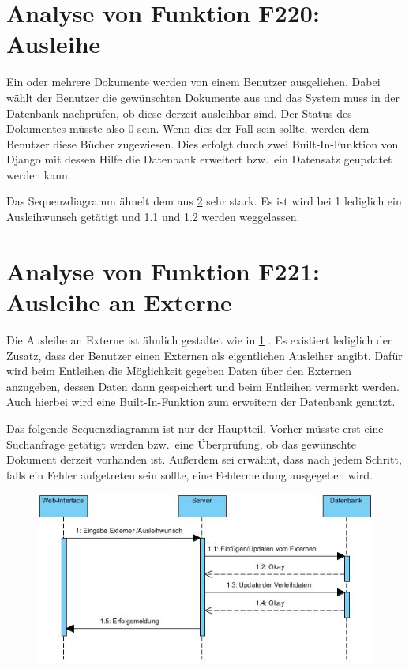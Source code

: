 \section{Analyse von Funktion F220: Ausleihe}
\label{f:220}
Ein oder mehrere Dokumente werden von einem Benutzer ausgeliehen. Dabei wählt der Benutzer die gewünschten Dokumente aus und das System muss in der Datenbank nachprüfen, ob diese derzeit ausleihbar sind. Der Status des Dokumentes müsste also 0 sein. Wenn dies der Fall sein sollte, werden dem Benutzer diese Bücher zugewiesen. Dies erfolgt durch zwei Built-In-Funktion von Django mit dessen Hilfe die Datenbank erweitert bzw.\ ein Datensatz geupdatet werden kann.

Das Sequenzdiagramm ähnelt dem aus \ref{f:221}  sehr stark. Es ist wird bei 1 lediglich ein Ausleihwunsch getätigt und 1.1 und 1.2 werden weggelassen. 

\section{Analyse von Funktion F221: Ausleihe an Externe}
\label{f:221}
Die Ausleihe an Externe ist ähnlich gestaltet wie in \ref{f:220} . Es existiert lediglich der Zusatz, dass der Benutzer einen Externen als eigentlichen Ausleiher angibt. Dafür wird beim Entleihen die Möglichkeit gegeben Daten über den Externen anzugeben, dessen Daten dann gespeichert und beim Entleihen vermerkt werden. Auch hierbei wird eine Built-In-Funktion zum erweitern der Datenbank genutzt.

Das folgende Sequenzdiagramm ist nur der Hauptteil. Vorher müsste erst eine Suchanfrage getätigt werden bzw.\ eine Überprüfung, ob das gewünschte Dokument derzeit vorhanden ist. Außerdem sei erwähnt, dass nach jedem Schritt, falls ein Fehler aufgetreten sein sollte, eine Fehlermeldung ausgegeben wird.
\begin{figure}
\includegraphics[width=0.8\linewidth]{bilder/Seq-Ausleihe.jpg}
\label{fig:221}
\end{figure}

